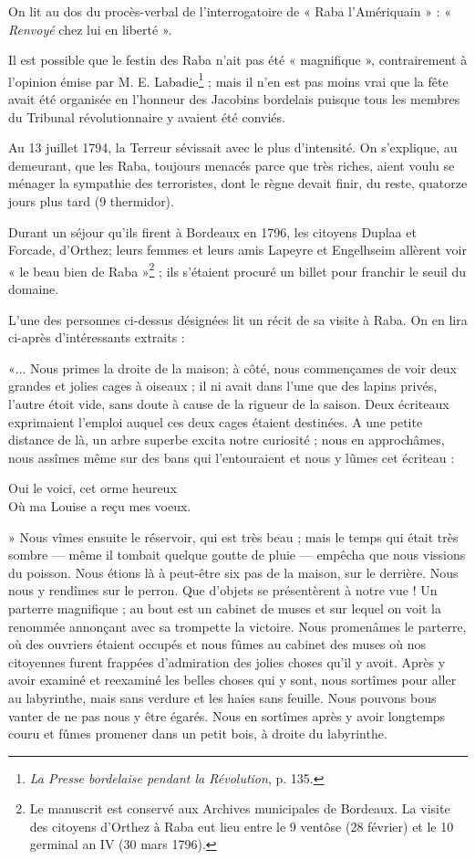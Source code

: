 On lit au dos du procès-verbal de l'interrogatoire de « Raba l'Amériquain » : « \textit{Renvoyé} chez lui en liberté ».

Il est possible que le festin des Raba n'ait pas été « magnifique », contrairement à l'opinion émise par M. E. Labadie\footnote{\textit{La Presse bordelaise pendant la Révolution}, p. 135.} ; mais il n'en est pas moins vrai que la fête avait été organisée en l'honneur des Jacobins bordelais puisque tous les membres du Tribunal révolutionnaire y avaient été conviés.

Au 13 juillet 1794, la Terreur sévissait avec le plus d'intensité. On s'explique, au demeurant, que les Raba, toujours menacés parce que très riches, aient voulu se ménager la sympathie des terroristes, dont le règne devait finir, du reste, quatorze jours plus tard (9 thermidor).

\asterism{}

Durant un séjour qu'ils firent à Bordeaux en 1796, les citoyens Duplaa et Forcade, d'Orthez; leurs femmes et leurs amis Lapeyre et Engelhseim allèrent voir « le beau bien de Raba »\footnote{Le manuscrit est conservé aux Archives municipales de Bordeaux. La visite des citoyens d'Orthez à Raba eut lieu entre le 9 ventôse (28 février) et le 10 germinal an IV (30 mars 1796).} ; ils s'étaient procuré un billet pour franchir le seuil du domaine.

L'une des personnes ci-dessus désignées lit un récit de sa visite à Raba. On en lira ci-après d'intéressants extraits :

«... Nous primes la droite de la maison; à côté, nous commençames de voir deux grandes et jolies cages à oiseaux ; il ni avait dans l'une que des lapins privés, l'autre étoit vide, sans doute à cause de la rigueur de la saison. Deux écriteaux exprimaient l'emploi auquel ces deux cages étaient destinées. A une petite distance de là, un arbre superbe excita notre curiosité ; nous en approchâmes, nous assîmes même sur des bans qui l'entouraient et nous y lûmes cet écriteau : 

\begin{center}
Oui le voici, cet orme heureux\\
Où ma Louise a reçu mes voeux.
\end{center}

» Nous vîmes ensuite le réservoir, qui est très beau ; mais le temps qui était très sombre — même il tombait quelque goutte de pluie — empêcha que nous vissions du poisson. Nous étions là à peut-être six pas de la maison, sur le derrière. Nous nous y rendîmes sur le perron. Que d'objets se présentèrent à notre vue ! Un parterre magnifique ; au bout est un cabinet de muses et sur lequel on voit la renommée annonçant avec sa trompette la victoire. Nous promenâmes le parterre, où des ouvriers étaient occupés et nous fûmes au cabinet des muses où nos citoyennes furent frappées d'admiration des jolies choses qu'il y avoit. Après y avoir examiné et reexaminé les belles choses qui y sont, nous sortîmes pour aller au labyrinthe, mais
sans verdure et les haies sans feuille. Nous pouvons bous vanter de ne pas nous y être égarés. Nous en sortîmes après y avoir longtemps couru et fûmes promener dans un petit bois, à droite du labyrinthe.

